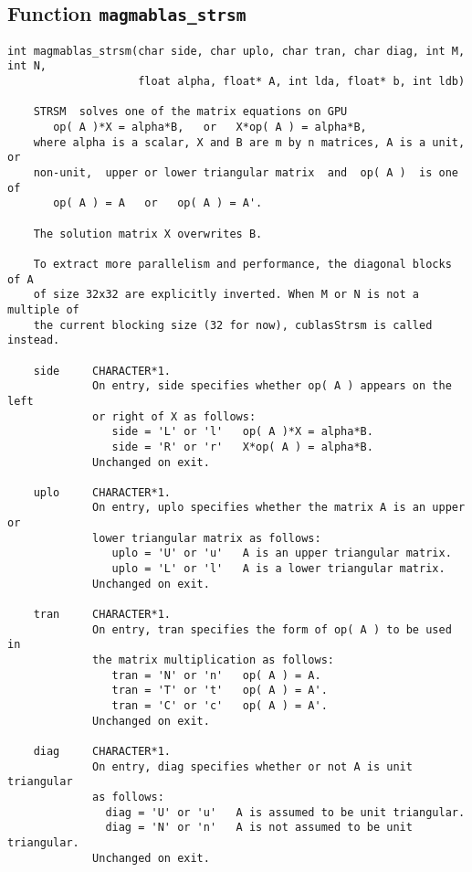 \documentclass[10pt]{book}
\begin{document}
\subsection{Function {\tt {\bf magmablas\_strsm}}}
\begin{verbatim}
int magmablas_strsm(char side, char uplo, char tran, char diag, int M, int N,
                    float alpha, float* A, int lda, float* b, int ldb)
   
    STRSM  solves one of the matrix equations on GPU
       op( A )*X = alpha*B,   or   X*op( A ) = alpha*B,   
    where alpha is a scalar, X and B are m by n matrices, A is a unit, or
    non-unit,  upper or lower triangular matrix  and  op( A )  is one  of 
       op( A ) = A   or   op( A ) = A'.

    The solution matrix X overwrites B.

    To extract more parallelism and performance, the diagonal blocks of A 
    of size 32x32 are explicitly inverted. When M or N is not a multiple of 
    the current blocking size (32 for now), cublasStrsm is called instead. 
   
    side     CHARACTER*1.
             On entry, side specifies whether op( A ) appears on the left
             or right of X as follows:
                side = 'L' or 'l'   op( A )*X = alpha*B.
                side = 'R' or 'r'   X*op( A ) = alpha*B.  
             Unchanged on exit.
  
    uplo     CHARACTER*1.
             On entry, uplo specifies whether the matrix A is an upper or
             lower triangular matrix as follows:
                uplo = 'U' or 'u'   A is an upper triangular matrix.
                uplo = 'L' or 'l'   A is a lower triangular matrix.
             Unchanged on exit.
   
    tran     CHARACTER*1.
             On entry, tran specifies the form of op( A ) to be used in
             the matrix multiplication as follows:
                tran = 'N' or 'n'   op( A ) = A.   
                tran = 'T' or 't'   op( A ) = A'.  
                tran = 'C' or 'c'   op( A ) = A'.
             Unchanged on exit.
   
    diag     CHARACTER*1.
             On entry, diag specifies whether or not A is unit triangular
             as follows:
               diag = 'U' or 'u'   A is assumed to be unit triangular.   
               diag = 'N' or 'n'   A is not assumed to be unit triangular.
             Unchanged on exit.


\end{verbatim}
\end{document}

